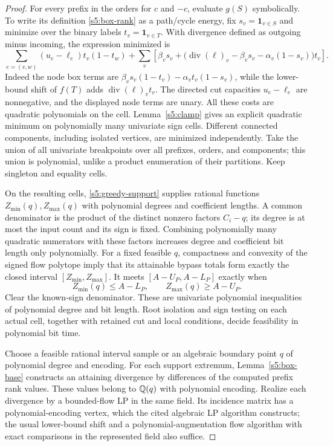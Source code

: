 \begin{proof}
For every prefix in the orders for $c$ and $-c$, evaluate $g(S)$
symbolically. To write its definition \eqref{s5:box-rank} as a path/cycle
energy, fix $s_v=\mathbf1_{v\in S}$ and minimize over the binary labels
$t_v=\mathbf1_{v\in T}$. With divergence defined as outgoing minus
incoming, the expression minimized is
\begin{equation}
 \sum_{e=(v,w)}(u_e-\ell_e)t_v(1-t_w)
 +\sum_v\left[\beta_vs_v+
 \bigl(\operatorname{div}(\ell)_v-\beta_vs_v
                  -\alpha_v(1-s_v)\bigr)t_v\right].
 \label{s5:rank-energy}
\end{equation}
Indeed the node box terms are
$\beta_vs_v(1-t_v)-\alpha_vt_v(1-s_v)$, while the lower-bound shift
of $f(T)$ adds $\operatorname{div}(\ell)_vt_v$.
The directed cut capacities $u_e-\ell_e$ are nonnegative, and the
displayed node terms are unary. All these costs are quadratic polynomials on the
cell. Lemma~\ref{s5:clamp} gives an explicit quadratic minimum on
polynomially many univariate sign cells. Different connected components,
including isolated vertices, are minimized independently. Take the union
of all univariate breakpoints over all prefixes, orders, and components;
this union is polynomial, unlike a product enumeration of their
partitions. Keep singleton and equality cells.

On the resulting cells, \eqref{s5:greedy-support} supplies rational
functions $Z_{\min}(q),Z_{\max}(q)$ with polynomial degrees and
coefficient lengths. A common denominator is the product of the
distinct nonzero factors $C_i-q$; its degree is at most the input count
and its sign is fixed. Combining polynomially many quadratic numerators
with these factors increases degree and coefficient bit length only polynomially.
For a fixed feasible $q$, compactness and convexity of the signed flow
polytope imply that its attainable bypass totals form exactly the closed
interval $[Z_{\min},Z_{\max}]$. It meets $[A-U_P,A-L_P]$ exactly when
\begin{equation}
 Z_{\min}(q)\le A-L_P,\qquad Z_{\max}(q)\ge A-U_P.
 \label{s5:capacity-test}
\end{equation}
Clear the known-sign denominator. These are univariate polynomial
inequalities of polynomial degree and bit length. Root isolation and
sign testing on each actual cell, together with retained cut and local
conditions, decide feasibility in polynomial bit time.

Choose a feasible rational interval sample or an algebraic boundary
point $q$ of polynomial degree and encoding. For each support extremum,
Lemma~\ref{s5:box-base} constructs an attaining divergence by differences
of the computed prefix rank values. These values belong to $\mathbb Q(q)$
with polynomial encoding. Realize each divergence by a bounded-flow LP
in the same field. Its incidence matrix has a polynomial-encoding
vertex, which the cited algebraic LP algorithm constructs; the usual
lower-bound shift and a polynomial-augmentation
flow algorithm with exact comparisons in the represented field also suffice.


\end{proof}
